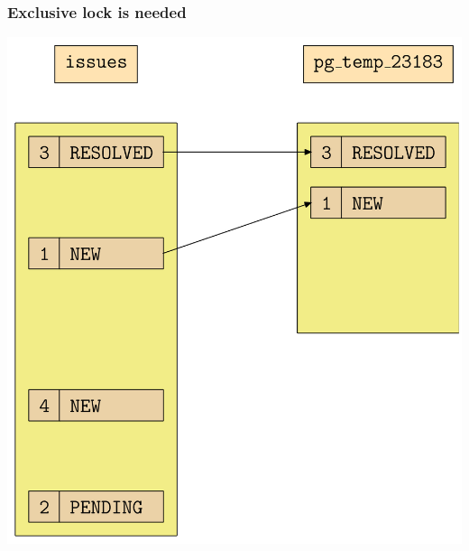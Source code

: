 \begin{frame}
  \frametitle{Exclusive lock is needed}
  \begin{center}
    \includegraphics[height=\sizeforimages\textheight]{images/exclusive_lock_needed_02.png}
  \end{center}
\end{frame}

